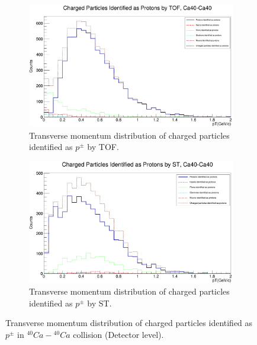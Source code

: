 \documentclass[12pt, twocolumn]{article}
\begin{document}
\begin{figure}[h]
\centering
\begin{subfigure}[h]{0.49\textwidth}
\centering
\includegraphics[scale=0.1398]{Detector_pT_protons(tof)_Ca.png}
\caption{Transverse momentum distribution of charged particles identified as $p^{\pm}$ by TOF.}
\label{Detector - Transverse momentum distribution of protons (TOF) Ca40.}
\end{subfigure}
\hfill
\begin{subfigure}[h]{0.49\textwidth}
\centering
\includegraphics[scale=0.1398]{Detector_pT_protons(st)_Ca.png}
\caption{Transverse momentum distribution of charged particles identified as $p^{\pm}$ by ST.}
\label{Detector - Transverse momentum distribution of protons (ST) Ca40.}
\end{subfigure}
\caption{Transverse momentum distribution of charged particles identified as $p^{\pm}$ in $^{40}Ca-{^{40}Ca}$ collision (Detector level).}
\label{Transverse momentum distribution of charged particles identified as protons in Ca40-Ca40 collision.}
\end{figure}
\end{document}
